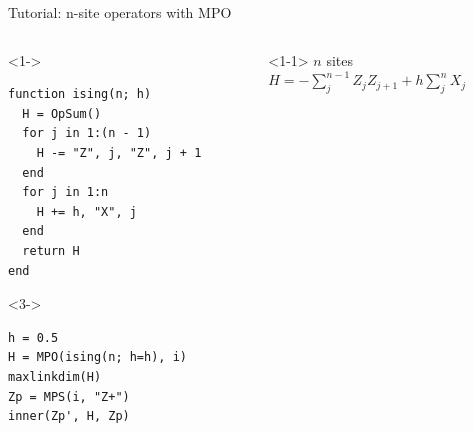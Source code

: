 \begin{frame}[fragile]{Tutorial: n-site operators with MPO}

\begin{columns}

\begin{column}{5cm}

\begin{onlyenv}<1->
\begin{lstlisting}[language=JuliaLocal, style=julia, mathescape, basicstyle=\small]
function ising(n; h)
  H = OpSum()
  for j in 1:(n - 1)
    H -= "Z", j, "Z", j + 1
  end
  for j in 1:n
    H += h, "X", j
  end
  return H
end
\end{lstlisting}
\end{onlyenv}

\begin{onlyenv}<3->
\begin{lstlisting}[language=JuliaLocal, style=julia, mathescape, basicstyle=\small]
h = 0.5
H = MPO(ising(n; h=h), i)
maxlinkdim(H)
Zp = MPS(i, "Z+")
inner(Zp', H, Zp)
 \end{lstlisting}
\end{onlyenv}

\end{column}

\begin{column}{5.5cm}

\begin{onlyenv}<1-1>
$n$ sites \\
$H = -\sum_j^{n-1} Z_j Z_{j+1} + h \sum_j^n X_j$ \\
~\\
~\\
~\\
~\\
~\\
~\\
~\\
~\\
\end{onlyenv}


\end{column}
\end{columns}
\end{frame}
